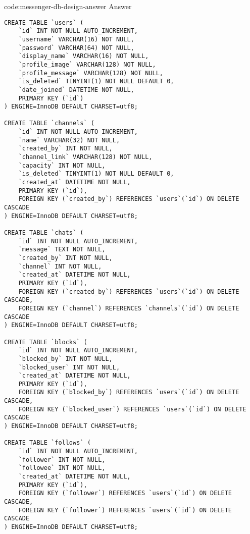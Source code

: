 \begin{code}{code:messenger-db-design-answer}{ Answer}
\begin{verbatim}
CREATE TABLE `users` (
    `id` INT NOT NULL AUTO_INCREMENT,
    `username` VARCHAR(16) NOT NULL,
    `password` VARCHAR(64) NOT NULL,
    `display_name` VARCHAR(16) NOT NULL,
    `profile_image` VARCHAR(128) NOT NULL,
    `profile_message` VARCHAR(128) NOT NULL,
    `is_deleted` TINYINT(1) NOT NULL DEFAULT 0,
    `date_joined` DATETIME NOT NULL,
    PRIMARY KEY (`id`)
) ENGINE=InnoDB DEFAULT CHARSET=utf8;

CREATE TABLE `channels` (
    `id` INT NOT NULL AUTO_INCREMENT,
    `name` VARCHAR(32) NOT NULL,
    `created_by` INT NOT NULL,
    `channel_link` VARCHAR(128) NOT NULL,
    `capacity` INT NOT NULL,
    `is_deleted` TINYINT(1) NOT NULL DEFAULT 0,
    `created_at` DATETIME NOT NULL,
    PRIMARY KEY (`id`),
    FOREIGN KEY (`created_by`) REFERENCES `users`(`id`) ON DELETE CASCADE
) ENGINE=InnoDB DEFAULT CHARSET=utf8;

CREATE TABLE `chats` (
    `id` INT NOT NULL AUTO_INCREMENT,
    `message` TEXT NOT NULL,
    `created_by` INT NOT NULL,
    `channel` INT NOT NULL,
    `created_at` DATETIME NOT NULL,
    PRIMARY KEY (`id`),
    FOREIGN KEY (`created_by`) REFERENCES `users`(`id`) ON DELETE CASCADE,
    FOREIGN KEY (`channel`) REFERENCES `channels`(`id`) ON DELETE CASCADE
) ENGINE=InnoDB DEFAULT CHARSET=utf8;

CREATE TABLE `blocks` (
    `id` INT NOT NULL AUTO_INCREMENT,
    `blocked_by` INT NOT NULL,
    `blocked_user` INT NOT NULL,
    `created_at` DATETIME NOT NULL,
    PRIMARY KEY (`id`),
    FOREIGN KEY (`blocked_by`) REFERENCES `users`(`id`) ON DELETE CASCADE,
    FOREIGN KEY (`blocked_user`) REFERENCES `users`(`id`) ON DELETE CASCADE
) ENGINE=InnoDB DEFAULT CHARSET=utf8;

CREATE TABLE `follows` (
    `id` INT NOT NULL AUTO_INCREMENT,
    `follower` INT NOT NULL,
    `followee` INT NOT NULL,
    `created_at` DATETIME NOT NULL,
    PRIMARY KEY (`id`),
    FOREIGN KEY (`follower`) REFERENCES `users`(`id`) ON DELETE CASCADE,
    FOREIGN KEY (`follower`) REFERENCES `users`(`id`) ON DELETE CASCADE
) ENGINE=InnoDB DEFAULT CHARSET=utf8;
\end{verbatim}
\end{code}
